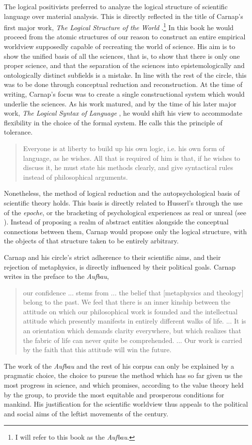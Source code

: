 \documentclass[leqno, 12pt]{turabian-researchpaper}
\begin{document}
	The logical positivists preferred to analyze the logical structure of scientific
	language over material analysis. This is directly reflected in the title of
	Carnap's first major work, \textit{The Logical Structure of the World} \nocite{carnap2003}.\footnote{I
	will refer to this book as the \textit{Aufbau}.} In this book he would proceed
	from the atomic structures of our reason to construct an entire empirical worldview
	supposedly capable of recreating the world of science. His aim is to show the
	unified basis of all the sciences, that is, to show that there is only one
	proper science, and that the separation of the sciences into epistemologically
	and ontologically distinct subfields is a mistake. In line with the rest of
	the circle, this was to be done through conceptual reduction and reconstruction.
	At the time of writing, Carnap's focus was to create a single constructional system
	which would underlie the sciences. As his work matured, and by the time of his
	later major work, \textit{The Logical Syntax of Language} \nocite{carnap2000},
	he would shift his view to accommodate flexibility in the choice of the formal
	system. He calls this the principle of tolerance. \blockquote[{}]{Everyone is at liberty to build up his own logic, i.e. his own form of language, as he wishes. All that is required of him is that, if he wishes to discuss it, he must state his methods clearly, and give syntactical rules instead of philosophical arguments.}
	Nonetheless, the method of logical reduction and the autopsychological basis
	of scientific theory holds. This basis is directly related to Husserl's through
	the use of the \textit{epoche}, or the bracketing of psychological experiences
	as real or unreal (see ). Instead of proposing
	a realm of abstract entities alongside the conceptual connections between them,
	Carnap would propose only the logical structure, with the objects of that
	structure taken to be entirely arbitrary.

	Carnap and his circle's strict adherence to their scientific aims, and their rejection
	of metaphysics, is directly influenced by their political goals. Carnap writes
	in the preface to the \textit{Aufbau},
	\blockquote[{\cite[xvii-xviii]{carnap2003}}]{our confidence ... stems from ... the belief that [metaphysics and theology] belong to the past. We feel that there is an inner kinship between the attitude on which our philosophical work is founded and the intellectual attitude which presently manifests in entirely different walks of life. ... It is an orientation which demands clarity everywhere, but which realizes that the fabric of life can never quite be comprehended. ... Our work is carried by the faith that this attitude will win the future.}
	The work of the \textit{Aufbau} and the rest of his corpus can only be
	explained by a pragmatic choice, the choice to pursue the method which has so far
	given us the most progress in science, and which promises, according to the value
	theory held by the group, to provide the most equitable and prosperous
	conditions for mankind. His justification for the scientific worldview thus appeals
	to the political and social aims of the leftist movements of the 
	century.
\end{document}
